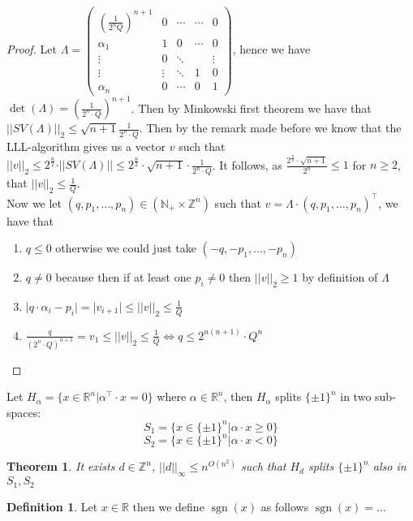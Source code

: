 \documentclass[a4paper,11pt,american]{article}
\newcommand{\N}{\mathbb{N}}
\newcommand{\R}{\mathbb{R}}
\newcommand{\Z}{\mathbb{Z}}
\newcommand{\norm}[1]{\vert\vert#1\vert\vert}
\DeclareMathOperator{\sign}{sgn}
\theoremstyle{plain}
\newtheorem{theorem}{Theorem}
\theoremstyle{definition}
\newtheorem{definition}{Definition}
\begin{document}
\begin{proof}
    Let $\Lambda=\begin{pmatrix}
    (\frac{1}{2^nQ})^{n+1} & 0 & \cdots & \cdots & 0 \\
    \alpha_1 & 1 & 0 & \cdots & 0 \\
    \vdots & 0 & \ddots & &  \vdots \\
     \vdots &\vdots & \ddots& 1 & 0 \\
    \alpha_n & 0 & \cdots & 0 & 1
\end{pmatrix}$, hence we have $\det(\Lambda)=(\frac{1}{2^n\cdot Q})^{n+1}$. Then by Minkowski first theorem we have that $\norm{SV(\Lambda)}_2\leq\sqrt{n+1}\frac{1}{2^n\cdot Q}$. Then by the remark made before we know that the LLL-algorithm gives us a vector $v$ such that $\norm{v}_2\leq2^{\frac{n}{2}}\cdot\norm{SV(\Lambda)}\leq 2^{\frac{n}{2}}\cdot\sqrt{n+1}\cdot\frac{1}{2^n\cdot Q}$. It follows, as $\frac{2^{\frac{n}{2}}\cdot\sqrt{n+1}}{2^n}\leq 1$ for $n\geq 2$, that $\norm{v}_2\leq \frac{1}{Q}$.\\
Now we let $(q,p_1,\dots,p_n)\in (\N_+\times\Z^n)$ such that $v=\Lambda\cdot (q,p_1,\dots,p_n)^\top$, we have that\begin{enumerate}
    \item $q\leq 0$ otherwise we could just take $(-q,-p_1,\dots,-p_n)$
    \item $q\neq 0$ because then if at least one $p_i\neq 0$ then $\norm{v}_2\geq 1$ by definition of $\Lambda$
    \item $\vert q\cdot\alpha_i-p_i\vert =\vert v_{i+1}\vert\leq\norm{v}_2\leq\frac{1}{Q}$
    \item $\frac{q}{(2^n\cdot Q)^{n+1}}=v_1\leq\norm{v}_2\leq\frac{1}{Q}\iff q\leq 2^{n(n+1)}\cdot Q^n$
\end{enumerate}
\end{proof}
Let $H_{\alpha}=\{x\in\R^n\vert \alpha^\top\cdot x=0\}$ where $\alpha\in\R^n$, then $H_{\alpha}$ splits $\{\pm1\}^n$ in two sub-spaces:
$$S_1=\{x\in\{\pm1\}^n\vert\alpha\cdot x\geq 0\}$$
$$S_2=\{x\in\{\pm1\}^n\vert\alpha\cdot x< 0\}$$
\begin{theorem}
    It exists $d\in\Z^n$, $\norm{d}_{\infty}\leq n^{O(n^2)}$ such that $H_d$ splits $\{\pm 1\}^n$ also in $S_1,S_2$
\end{theorem}
\begin{definition}
    Let $x\in \R$ then we define $\sign(x)$ as follows $\sign (x)=...$
\end{definition}
\end{document}
